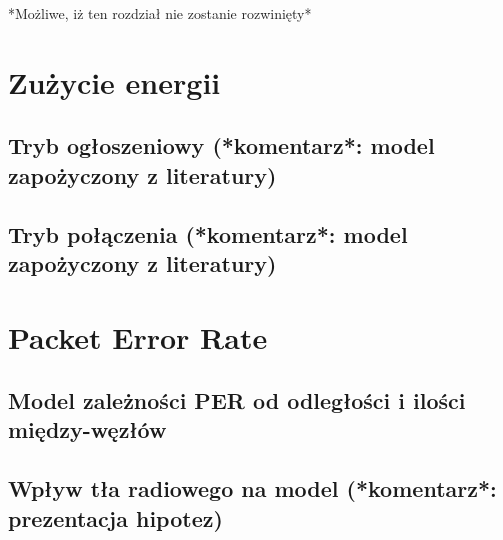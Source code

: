 *Możliwe, iż ten rozdział nie zostanie rozwinięty*
\section{Zużycie energii}
\subsection{Tryb ogłoszeniowy (*komentarz*: model zapożyczony z literatury)}
\subsection{Tryb połączenia (*komentarz*: model zapożyczony z literatury)}

\section{Packet Error Rate}
\subsection{Model zależności PER od odległości i ilości między-węzłów}
\subsection{Wpływ tła radiowego na model (*komentarz*: prezentacja hipotez)}

